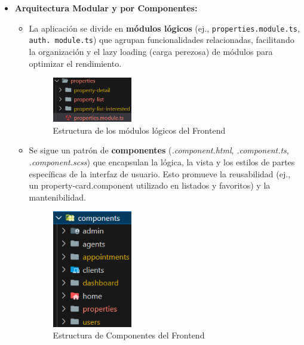 \begin{itemize}
    \item \textbf{Arquitectura Modular y por Componentes:}
    
    \begin{itemize}
        \item La aplicación se divide en \textbf{módulos lógicos} (ej., \texttt{properties.module.ts}, \texttt{auth. module.ts}) que agrupan funcionalidades relacionadas, facilitando la organización y el lazy loading (carga perezosa) de módulos para optimizar el rendimiento.

        \begin{figure}[H]
            \begin{center}
                \includegraphics[width = 0.35\textwidth]{Figuras/directoriosfrontendcomponentsproperties.png}
            \end{center}
            \caption{\label{fig:directoriosfrontendcomponentsproperties} Estructura de los módulos lógicos del Frontend}
        \end{figure}

        \item Se sigue un patrón de \textbf{componentes} (\textit{.component.html}, \textit{.component.ts}, \textit{.component.scss}) que encapsulan la lógica, la vista y los estilos de partes específicas de la interfaz de usuario. Esto promueve la reusabilidad (ej., un property-card.component utilizado en listados y favoritos) y la mantenibilidad.

        \begin{figure}[H]
            \begin{center}
                \includegraphics[width = 0.35\textwidth]{Figuras/directoriosfrontendcomponents.png}
            \end{center}
            \caption{\label{fig:directoriosfrontendcomponents} Estructura de Componentes del Frontend}
        \end{figure}
    \end{itemize}


\end{itemize}
